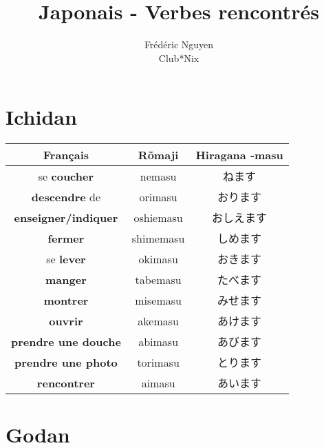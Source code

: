 \documentclass[11pt]{report}
\title{Japonais - Verbes rencontrés}
\author{
	Frédéric Nguyen \\ Club*Nix
}
\newenvironment{Japanese}{%
\CJKfamily{min}%
\CJKtilde  
\CJKnospace}{}
\begin{document}
\maketitle
\tableofcontents

\chapter{Ichidan}

\begin{CJK}{UTF8}{}  
\begin{Japanese}
	\begin{center}
		\begin{tabular}{|c|c|c|}
				\hline
				\textbf{Français} & \textbf{Rõmaji} & \textbf{Hiragana -masu} \\
				\hline
				se \textbf{coucher} & nemasu & ねます \\	
				\hline 
				\textbf{descendre} de & orimasu & おります \\
				\hline
				\textbf{enseigner/indiquer} & oshiemasu & おしえます \\
				\hline
				\textbf{fermer} & shimemasu & しめます \\
				\hline
				se \textbf{lever} & okimasu & おきます \\
				\hline
				\textbf{manger} & tabemasu & たべます \\
				\hline
				\textbf{montrer} & misemasu & みせます \\
				\hline
				\textbf{ouvrir} & akemasu & あけます \\
				\hline
				\textbf{prendre une douche} & abimasu & あびます \\
				\hline
				\textbf{prendre une photo} & torimasu & とります \\
				\hline
				\textbf{rencontrer} & aimasu & あいます \\
				\hline
			\end{tabular}
	\end{center}
\end{Japanese}  
\end{CJK}

\chapter{Godan}
\end{document}
